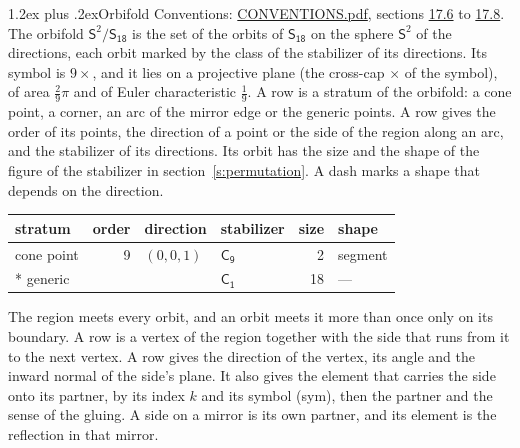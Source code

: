 \documentclass[10pt,a4paper]{article}
\makeatletter
\renewcommand\section{\@startsection{section}{1}{\z@}{-3ex plus -1ex minus -.2ex}%
  {1.2ex plus .2ex}{\normalfont\large\sffamily\bfseries\color{parttitle}}}
\numberwithin{equation}{section}
\newcommand{\grp}[1]{\mathsf{#1}}
\newcommand{\orbname}[1]{#1}
\newcommand{\dirvec}[3]{(#1, #2, #3)}
\newcommand{\twosphere}{\mathsf{S}^{2}}
\makeatother
\begin{document}
\section{Orbifold}\label{s:orbifold}
Conventions: \href{../../CONVENTIONS.pdf}{CONVENTIONS.pdf}, sections \href{../../CONVENTIONS.pdf\#conv.17.6}{17.6} to \href{../../CONVENTIONS.pdf\#conv.17.8}{17.8}.
The orbifold $\twosphere/\grp{S_{18}}$ is the set of the orbits of $\grp{S_{18}}$ on the sphere $\twosphere$ of the directions, each orbit marked by the class of the stabilizer of its directions. Its symbol is $\orbname{9{\times}}$, and it lies on a projective plane (the cross-cap ${\times}$ of the symbol), of area $\tfrac{2}{9}\pi$ and of Euler characteristic $\tfrac{1}{9}$.
\leavevmode\label{n:head.stratum}\label{n:head.order.point}\label{n:head.direction}\label{n:head.stabilizer}\label{n:head.size.orbit}\label{n:head.shape}A row is a stratum of the orbifold: a cone point, a corner, an arc of the mirror edge or the generic points. A row gives the order of its points, the direction of a point or the side of the region along an arc, and the stabilizer of its directions. Its orbit has the size and the shape of the figure of the stabilizer in section~\ref{s:permutation}. A dash marks a shape that depends on the direction.
{\small\setlength{\tabcolsep}{4pt}\begin{longtable}{@{}lrllrl@{}}\toprule
stratum & order & direction & stabilizer & size & shape\\\midrule\endhead
\bottomrule\endfoot\endlastfoot
cone point & 9 & $\dirvec{0}{0}{1}$ & \href{C9.pdf}{$\grp{C_{9}}$} & 2 & segment\\*
generic &  &  & \href{C1.pdf}{$\grp{C_{1}}$} & 18 & ---\\
\bottomrule\end{longtable}}
\leavevmode\label{n:head.vertex.region}\label{n:head.angle}\label{n:head.normal.side}\label{n:head.partner}\label{n:head.sense}The region meets every orbit, and an orbit meets it more than once only on its boundary. A row is a vertex of the region together with the side that runs from it to the next vertex. A row gives the direction of the vertex, its angle and the inward normal of the side's plane. It also gives the element that carries the side onto its partner, by its index $k$ and its symbol (sym), then the partner and the sense of the gluing. A side on a mirror is its own partner, and its element is the reflection in that mirror.
\end{document}
